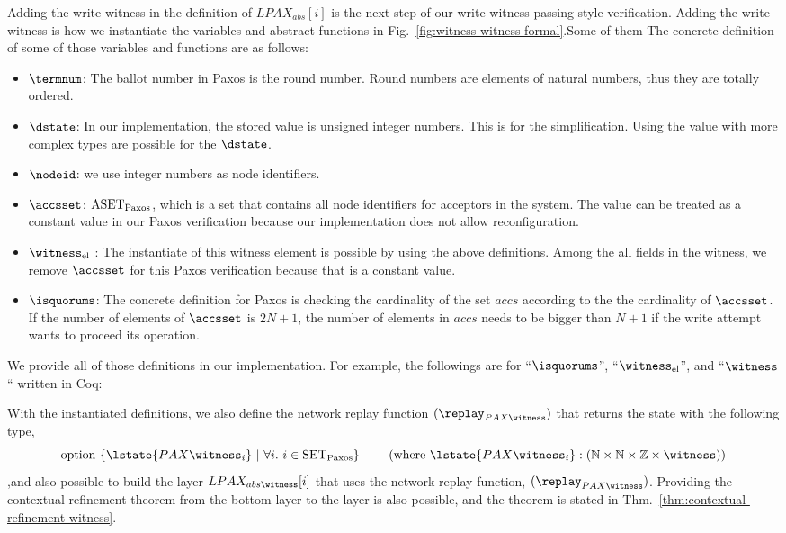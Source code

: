 Adding the write-witness in the definition of $LPAX_{abs}[i]$
is the next step of our write-witness-passing style verification. 
Adding the write-witness is how we instantiate the variables and abstract functions in Fig.~\ref{fig:witness-witness-formal}.Some of them
The concrete definition of some of those variables and functions are as follows:
\begin{itemize}
\item $\termnum$: The ballot number in Paxos is the round number. Round numbers are elements of natural numbers, thus 
they are totally ordered. 
\item $\dstate$: In our implementation, the stored value is unsigned integer numbers. This is for the simplification. Using the value with more
complex types are possible for the $\dstate$.  
\item $\nodeid$: we use  integer numbers as node identifiers. 
\item $\accsset$: $\mathrm{ASET}_{\mathrm{Paxos}}$, which is a set that contains all node identifiers for acceptors in the system. The value can be treated as 
a constant value in our Paxos verification because our implementation does not allow reconfiguration.
\item $\witness_{\mathrm{el}}$ : The instantiate of this witness element is possible by using the above definitions. Among the all fields in 
the witness, we remove $\accsset$ for this Paxos verification because that is a constant value.
\item $\isquorums$: The concrete definition for Paxos is checking the cardinality of the set $accs$ according to the 
the cardinality of $\accsset$. If the number of elements of $\accsset$ is $2N + 1$, the number of elements in $accs$ 
needs to be bigger than  $N + 1$ if the write attempt wants to proceed its operation.
\end{itemize}

We provide all of those definitions in our implementation. 
For example, the followings are for ``$\isquorums$'', ``$\witness_{\mathrm{el}}$'', and ``$\witness$`` written in Coq:


With the instantiated definitions, we also define  the network replay function $(\replay_{PAX\witness})$ that returns the state with the following type,
$$\mbox{option} \ \{\lstate{{PAX\witness}_i}~\vert~ \forall i.\ i \in \paxset\} \ \ \ \ \ \ \ (\mbox{where}\ \lstate{{PAX\witness}_i} : 
(\mathbb{N} \times \mathbb{N} \times \mathbb{Z} \times \witness))$$
,and also possible to build the layer $LPAX_{abs\witness}[i]$ that uses the network replay function, $(\replay_{PAX\witness})$.
Providing the contextual refinement theorem from the bottom layer to the layer is also possible, and the theorem is
stated in Thm.~\ref{thm:contextual-refinement-witness}.

